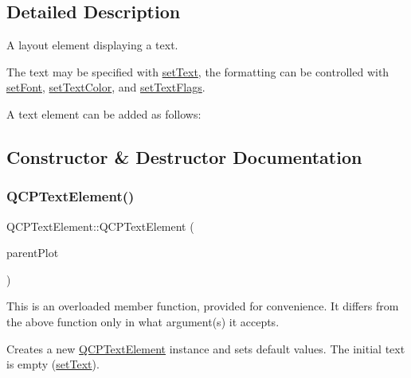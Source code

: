 \subsection{Detailed Description}
A layout element displaying a text. 

The text may be specified with \hyperlink{class_q_c_p_text_element_ac44b81e69e719b879eb2feecb33557e2}{set\+Text}, the formatting can be controlled with \hyperlink{class_q_c_p_text_element_a09b3241769528fa87cb4bf35c97defad}{set\+Font}, \hyperlink{class_q_c_p_text_element_a4f3b8361c3ffb3f84346954929ce93ba}{set\+Text\+Color}, and \hyperlink{class_q_c_p_text_element_ab908f437f552020888a3ad8cf8242605}{set\+Text\+Flags}.

A text element can be added as follows\+: 
\begin{DoxyCodeInclude}
\end{DoxyCodeInclude}


\subsection{Constructor \& Destructor Documentation}
\mbox{\label{class_q_c_p_text_element_ae1de18bdb1e7ba959f132018dd9a0258}} 
\subsubsection{\texorpdfstring{Q\+C\+P\+Text\+Element()}{QCPTextElement()}\hspace{0.1cm}{\footnotesize\ttfamily [1/5]}}
{\footnotesize\ttfamily Q\+C\+P\+Text\+Element\+::\+Q\+C\+P\+Text\+Element (\begin{DoxyParamCaption}\item[{\hyperlink{class_q_custom_plot}{Q\+Custom\+Plot} $\ast$}]{parent\+Plot }\end{DoxyParamCaption})\hspace{0.3cm}{\ttfamily [explicit]}}

This is an overloaded member function, provided for convenience. It differs from the above function only in what argument(s) it accepts.

Creates a new \hyperlink{class_q_c_p_text_element}{Q\+C\+P\+Text\+Element} instance and sets default values. The initial text is empty (\hyperlink{class_q_c_p_text_element_ac44b81e69e719b879eb2feecb33557e2}{set\+Text}). \mbox{\label{class_q_c_p_text_element_a00f08a8a3363ad8d7d12ca0db4922b6b}} 

